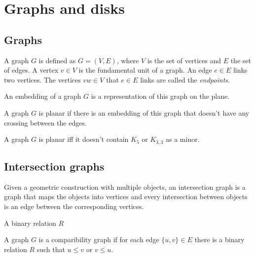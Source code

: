 \section{Graphs and disks}
\label{sec:graphs}


\subsection{Graphs}

A graph $G$ is defined as $G = (V,E)$, where $V$ is the set of vertices and $E$ the set of edges. A vertex $v \in V$ is the fundamental unit of a graph. An edge $e \in E$ links two vertices. The vertices $vw \in V$ that $e \in E$ links are called the \textit{endpoints}.

\begin{defn}
  An embedding of a graph $G$ is a representation of this graph on the plane.
\end{defn}

A graph $G$ is planar if there is an embedding of this graph that doesn't have any crossing between the edges.

\begin{theorem}[Kuratowski]
  A graph $G$ is planar iff it doesn't contain $K_5$ or $K_{3,3}$ as a minor.
\end{theorem}


\subsection{Intersection graphs}


Given a geometric construction with multiple objects, an intersection graph is a
graph that maps the objects into vertices and every intersection between objects
is an edge between the corresponding vertices.

\begin{defn}
  A binary relation $R$
\end{defn}

\begin{defn}
  A graph $G$ is a comparibility graph if for each edge $\{u,v\} \in E$ there is
  a binary relation $R$ such that $u \leq v$ or $v \leq u$.
\end{defn}

